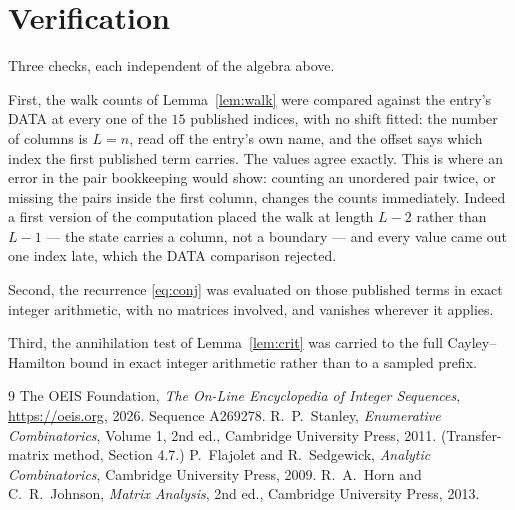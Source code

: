 \documentclass[11pt,a4paper]{article}
\theoremstyle{plain}
\theoremstyle{definition}
\begin{document}
\section{Verification}

Three checks, each independent of the algebra above.

First, the walk counts of Lemma~\ref{lem:walk} were compared against the entry's DATA at
every one of the $15$ published indices, with no shift fitted: the number of columns is
$L=n$, read off the entry's own name, and the offset says which index the first
published term carries. The values agree exactly. This is where an error in the pair
bookkeeping would show: counting an unordered pair twice, or missing the pairs inside the
first column, changes the counts immediately. Indeed a first version of the computation
placed the walk at length $L-2$ rather than $L-1$ --- the state carries a column, not a
boundary --- and every value came out one index late, which the DATA comparison rejected.

Second, the recurrence \eqref{eq:conj} was evaluated on those published terms in exact
integer arithmetic, with no matrices involved, and vanishes wherever it applies.

Third, the annihilation test of Lemma~\ref{lem:crit} was carried to the full
Cayley--Hamilton bound in exact integer arithmetic rather than to a sampled prefix.

\begin{thebibliography}{9}
 The OEIS Foundation, \emph{The On-Line Encyclopedia of Integer
Sequences}, \url{https://oeis.org}, 2026. Sequence A269278.
 R.~P.~Stanley, \emph{Enumerative Combinatorics}, Volume 1, 2nd ed.,
Cambridge University Press, 2011. (Transfer-matrix method, Section 4.7.)
 P.~Flajolet and R.~Sedgewick, \emph{Analytic Combinatorics}, Cambridge
University Press, 2009.
 R.~A.~Horn and C.~R.~Johnson, \emph{Matrix Analysis}, 2nd ed., Cambridge
University Press, 2013.
\end{thebibliography}
\end{document}
